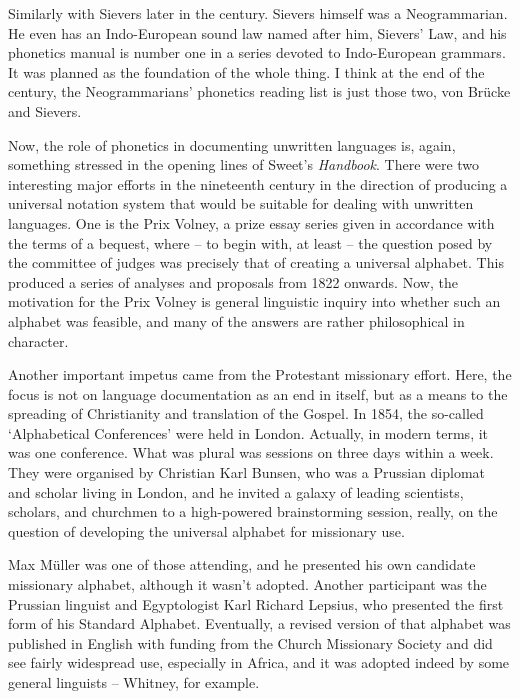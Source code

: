 \documentclass[output=paper]{langscibook}
\begin{document}
Similarly with Sievers later in the century. Sievers himself was a Neogrammarian. He even has an Indo-European sound law named after him, Sievers’ Law, and his phonetics manual is number one in a series devoted to Indo-European grammars. It was planned as the foundation of the whole thing. I think at the end of the century, the Neogrammarians’ phonetics reading list is just those two, von Brücke and Sievers. 

\begin{sloppypar}Now, the role of phonetics in documenting unwritten languages is, again, something stressed in the opening lines of Sweet's \citeyear{Sweet1877} \textit{Handbook}. There were two interesting major efforts in the nineteenth century in the direction of producing a universal notation system that would be suitable for dealing with unwritten languages. One is the Prix Volney, a prize essay series given in accordance with the terms of a  bequest, where – to begin with, at least – the question posed by the committee of judges was precisely that of creating a universal alphabet. This produced a series of analyses and proposals from 1822 onwards. Now, the motivation for the Prix Volney is general linguistic inquiry into whether such an alphabet was feasible, and many of the answers are rather philosophical in character.
\end{sloppypar}

Another important impetus came from the Protestant missionary effort. Here, the focus is not on language documentation as an end in itself, but as a means to the spreading of Christianity and translation of the Gospel. In 1854, the so-called ‘Alphabetical Conferences’ were held in London. Actually, in modern terms, it was one conference. What was plural was sessions on three days within a week. They were organised by Christian Karl Bunsen, who was a Prussian diplomat and scholar living in London, and he invited a galaxy of leading scientists, scholars, and churchmen to a high-powered brainstorming session, really, on the question of developing the universal alphabet for missionary use.

Max Müller was one of those attending, and he presented his own candidate missionary alphabet, although it wasn’t adopted. Another participant was the Prussian linguist and Egyptologist Karl Richard Lepsius, who presented the first form of his Standard Alphabet. Eventually, a revised version of that alphabet was published in English with funding from the Church Missionary Society and did see fairly widespread use, especially in Africa, and it was adopted indeed by some general linguists – Whitney, for example. 
\end{document}
